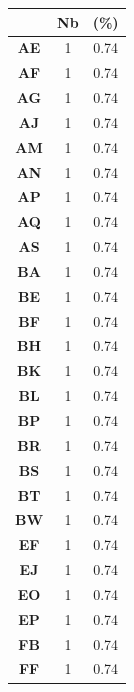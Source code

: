 \documentclass[a4paper, titlepage]{livret}
\begin{document}
\begin{center}
\begin{minipage}[c]{.3\linewidth}
\begin{tabular}{|c|c|c|}
 \hline
	& \textbf{Nb} & \textbf{(\%)}\\
	\hline
	\textbf{AE} &       1 &  0.74\\
	\hline
	\textbf{AF} &       1 &  0.74\\
	\hline
	\textbf{AG} &       1 &  0.74\\
	\hline
	\textbf{AJ} &       1 &  0.74\\
	\hline
	\textbf{AM} &       1 &  0.74\\
	\hline
	\textbf{AN} &       1 &  0.74\\
	\hline
	\textbf{AP} &       1 &  0.74\\
	\hline
	\textbf{AQ} &       1 &  0.74\\
	\hline
	\textbf{AS} &       1 &  0.74\\
	\hline
	\textbf{BA} &       1 &  0.74\\
	\hline
	\textbf{BE} &       1 &  0.74\\
	\hline
	\textbf{BF} &       1 &  0.74\\
	\hline
	\textbf{BH} &       1 &  0.74\\
	\hline
	\textbf{BK} &       1 &  0.74\\
	\hline
	\textbf{BL} &       1 &  0.74\\
	\hline
	\textbf{BP} &       1 &  0.74\\
	\hline
	\textbf{BR} &       1 &  0.74\\
	\hline
	\textbf{BS} &       1 &  0.74\\
	\hline
	\textbf{BT} &       1 &  0.74\\
	\hline
	\textbf{BW} &       1 &  0.74\\
	\hline
	\textbf{EF} &       1 &  0.74\\
	\hline
	\textbf{EJ} &       1 &  0.74\\
	\hline
	\textbf{EO} &       1 &  0.74\\
	\hline
	\textbf{EP} &       1 &  0.74\\
	\hline
	\textbf{FB} &       1 &  0.74\\
	\hline
	\textbf{FF} &       1 &  0.74\\
	\hline
\end{tabular}
  \label{tab34}
\end{minipage}
\begin{minipage}[c]{.3\linewidth}

\end{minipage}
\end{center}
\end{document}
